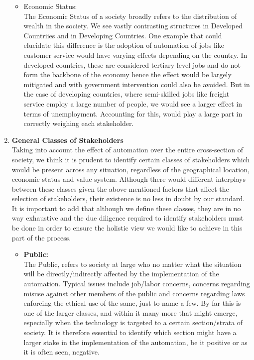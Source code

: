 \begin{enumerate}[a]
\begin{itemize}
      \item Economic Status:\\
        The Economic Status of a society broadly refers to the distribution of wealth in the society. We see vastly contrasting structures in Developed Countriies and in Developing Countries. One example that could elucidate this difference is the adoption of automation of jobs like customer service would have varying effects depending on the country. In developed countries, these are considered tertiary level jobs and do not form the backbone of the economy hence the effect would be largely mitigated and with government intervention could also be avoided. But in the case of developing countries, where semi-skilled jobs like freight service employ a large number of people, we would see a larger effect in terms of unemployment. Accounting for this, would play a large part in correctly weighing each stakeholder.
    \end{itemize}
  \item \textbf{General Classes of Stakeholders}\\
    Taking into account the effect of automation over the entire cross-section of society, we think it is prudent to identify certain classes of stakeholders which would be present across any situation, regardless of the geographical location, economic status and value system. Although there would different interplays between these classes given the above mentioned factors that affect the selection of stakeholders, their existence is no less in doubt by our standard.\\
    It is important to add that although we define these classes, they are in no way exhaustive and the due diligence required to identify stakeholders must be done in order to ensure the holistic view we would like to achieve in this part of the process.
    \begin{itemize}
      \item \textbf{Public:}\\
        The Public, refers to society at large who no matter what the situation will be directly/indirectly affected by the implementation of the automation. Typical issues include job/labor concerns, concerns regarding misuse against other members of the public and concerns regarding laws enforcing the ethical use of the same, just to name a few. By far this is one of the larger classes, and within it many more that might emerge, especially when the technology is targeted to a certain section/strata of society. It is therefore essential to identify which section might have a larger stake in the implementation of the automation, be it positive or as it is often seen, negative.

\end{itemize}
\end{enumerate}
